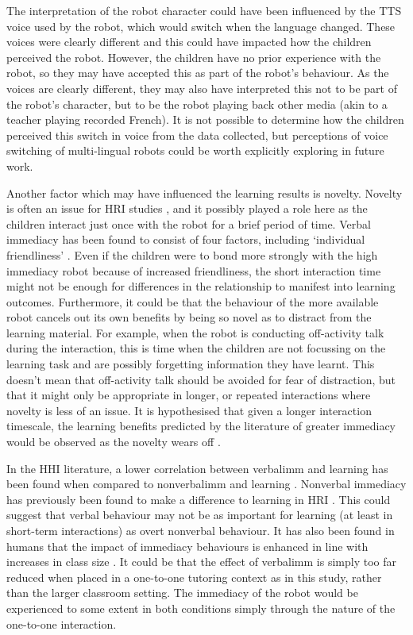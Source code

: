 The interpretation of the robot character could have been influenced by the TTS voice used by the robot, which would switch when the language changed. These voices were clearly different and this could have impacted how the children perceived the robot. However, the children have no prior experience with the robot, so they may have accepted this as part of the robot's behaviour. As the voices are clearly different, they may also have interpreted this not to be part of the robot's character, but to be the robot playing back other media (akin to a teacher playing recorded French). It is not possible to determine how the children perceived this switch in voice from the data collected, but perceptions of voice switching of multi-lingual robots could be worth explicitly exploring in future work.

Another factor which may have influenced the \gls{learning} results is novelty. Novelty is often an issue for HRI studies \citep{leite2013social,sung2009robots}, and it possibly played a role here as the children interact just once with the robot for a brief period of time. Verbal immediacy has been found to consist of four factors, including `individual friendliness' \citep{wilson2007immediacy}. Even if the children were to bond more strongly with the high immediacy robot because of increased friendliness, the short interaction time might not be enough for differences in the relationship to manifest into \gls{learning} outcomes. Furthermore, it could be that the behaviour of the more available robot cancels out its own benefits by being so novel as to distract from the learning material. For example, when the robot is conducting off-activity talk during the interaction, this is time when the children are not focussing on the learning task and are possibly forgetting information they have learnt. This doesn't mean that off-activity talk should be avoided for fear of distraction, but that it might only be appropriate in longer, or repeated interactions where novelty is less of an issue. It is hypothesised that given a longer interaction timescale, the \gls{learning} benefits predicted by the literature of greater immediacy \citep{gorham1988relationship,witt2004meta} would be observed as the novelty wears off \citep{kanda2004interactive,leite2013social}.

In the HHI literature, a lower correlation between \gls{verbalimm} and \gls{learning} has been found when compared to \gls{nonverbalimm} and learning \citep{witt2004meta}. Nonverbal immediacy has previously been found to make a difference to learning in HRI \citep{kennedy2015higher,szafir2012pay}. This could suggest that verbal behaviour may not be as important for \gls{learning} (at least in short-term interactions) as overt nonverbal behaviour. It has also been found in humans that the impact of immediacy behaviours is enhanced in line with increases in class size \citep{gorham1988relationship}. It could be that the effect of \gls{verbalimm} is simply too far reduced when placed in a one-to-one tutoring context as in this study, rather than the larger classroom setting. The immediacy of the robot would be experienced to some extent in both conditions simply through the nature of the one-to-one interaction.

